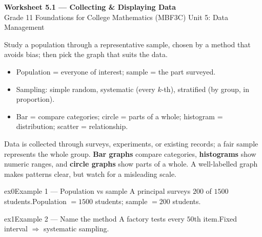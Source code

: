 \documentclass[11pt]{article}
\begin{document}
\begin{center}
{\LARGE\bfseries\color{titleblue}Worksheet 5.1 --- Collecting \& Displaying Data}\\[2pt]
{\small Grade 11 Foundations for College Mathematics (MBF3C) \textperiodcentered{} Unit 5: Data Management}
\end{center}

\begin{ideabox}
Study a population through a representative sample, chosen by a method that avoids bias; then pick the graph that suits the data.
\begin{itemize}[leftmargin=*,itemsep=2pt]
  \item Population = everyone of interest; sample = the part surveyed.
  \item Sampling: simple random, systematic (every $k$-th), stratified (by group, in proportion).
  \item Bar = compare categories; circle = parts of a whole; histogram = distribution; scatter = relationship.
\end{itemize}
\end{ideabox}

\begin{learnbox}
Data is collected through surveys, experiments, or existing records; a fair sample represents the whole group.
\textbf{Bar graphs} compare categories, \textbf{histograms} show numeric ranges, and \textbf{circle graphs} show parts of a whole.
A well-labelled graph makes patterns clear, but watch for a misleading scale.
\end{learnbox}


\begin{example}{ex0}{Example 1 --- Population vs sample}
A principal surveys $200$ of $1500$ students.\soln Population $=1500$ students; sample $=200$ students.
\end{example}

\begin{example}{ex1}{Example 2 --- Name the method}
A factory tests every $50$th item.\soln Fixed interval $\Rightarrow$ systematic sampling.
\end{example}
\end{document}
